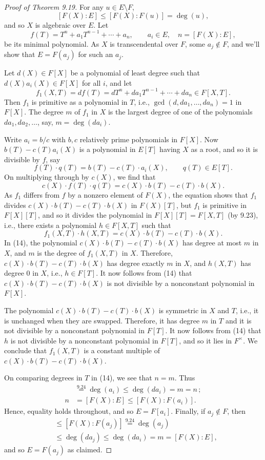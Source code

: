 \documentclass[UTF8,11pt]{ctexart}
\theoremstyle{definition}
\begin{document}
\begin{proof}[Proof of Theorem 9.19]
For any $u\in E\setminus F$,
\[
[F(X):E]\leq[F(X):F(u)]=\deg(u),
\]
and so $X$ is algebraic over $E$. Let
\[
f(T)=T^n+a_1T^{n-1}+\cdots+a_n,\qquad a_i\in E,\quad n=[F(X):E],
\]
be its minimal polynomial. As $X$ is transcendental over $F$, some $a_j\notin F$, and we'll show that $E=F(a_j)$ for such an $a_j$.

Let $d(X)\in F[X]$ be a polynomial of least degree such that $d(X)a_i(X)\in F[X]$ for all $i$, and let
\[
f_1(X,T)=df(T)=dT^n+da_1T^{n-1}+\cdots+da_n\in F[X,T].
\]
Then $f_1$ is primitive as a polynomial in $T$, i.e., $\gcd(d,da_1,\ldots,da_n)=1$ in $F[X]$. The degree $m$ of $f_1$ in $X$ is the largest degree of one of the polynomials $da_1,da_2,\ldots$, say, $m=\deg(da_i)$.

Write $a_i=b/c$ with $b,c$ relatively prime polynomials in $F[X]$. Now $b(T)-c(T)a_i(X)$ is a polynomial in $E[T]$ having $X$ as a root, and so it is divisible by $f$, say
\[
f(T)\cdot q(T)=b(T)-c(T)\cdot a_i(X),\qquad q(T)\in E[T].
\]
On multiplying through by $c(X)$, we find that
\[
c(X)\cdot f(T)\cdot q(T)=c(X)\cdot b(T)-c(T)\cdot b(X).
\]
As $f_1$ differs from $f$ by a nonzero element of $F(X)$, the equation shows that $f_1$ divides $c(X)\cdot b(T)-c(T)\cdot b(X)$ in $F(X)[T]$, but $f_1$ is primitive in $F[X][T]$, and so it divides the polynomial in $F[X][T]=F[X,T]$ (by 9.23), i.e., there exists a polynomial $h\in F[X,T]$ such that
\[
f_1(X,T)\cdot h(X,T)=c(X)\cdot b(T)-c(T)\cdot b(X).\tag{14}
\]
In (14), the polynomial $c(X)\cdot b(T)-c(T)\cdot b(X)$ has degree at most $m$ in $X$, and $m$ is the degree of $f_1(X,T)$ in $X$. Therefore, $c(X)\cdot b(T)-c(T)\cdot b(X)$ has degree exactly $m$ in $X$, and $h(X,T)$ has degree $0$ in $X$, i.e., $h\in F[T]$. It now follows from (14) that $c(X)\cdot b(T)-c(T)\cdot b(X)$ is not divisible by a nonconstant polynomial in $F[X]$.

The polynomial $c(X)\cdot b(T)-c(T)\cdot b(X)$ is symmetric in $X$ and $T$, i.e., it is unchanged when they are swapped. Therefore, it has degree $m$ in $T$ and it is not divisible by a nonconstant polynomial in $F[T]$. It now follows from (14) that $h$ is not divisible by a nonconstant polynomial in $F[T]$, and so it lies in $F^\times$. We conclude that $f_1(X,T)$ is a constant multiple of $c(X)\cdot b(T)-c(T)\cdot b(X)$.

On comparing degrees in $T$ in (14), we see that $n=m$. Thus
\begin{align*}
[F(X):F(a_i)]&\overset{9.24}{=}\deg(a_i)\leq\deg(da_i)=m=n\,;\\
n&=[F(X):E]\leq[F(X):F(a_i)].
\end{align*}
Hence, equality holds throughout, and so $E=F[a_i]$.
Finally, if $a_j\notin F$, then
\begin{align*}
[F(X):E]&\leq[F(X):F(a_j)]\overset{9.24}{=}\deg(a_j)\\
&\leq\deg(da_j)\leq\deg(da_i)=m=[F(X):E],
\end{align*}
and so $E=F(a_j)$ as claimed.
\end{proof}
\end{document}
